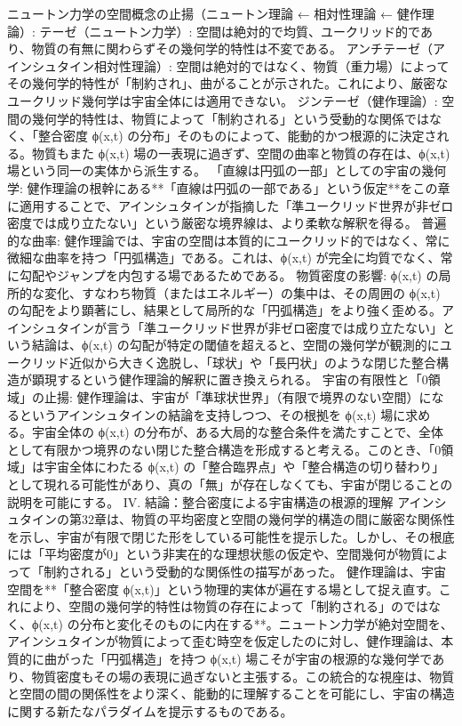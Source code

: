 \documentclass{article}
\begin{document}
ニュートン力学の空間概念の止揚（ニュートン理論 ← 相対性理論 ← 健作理論）:
テーゼ（ニュートン力学）: 空間は絶対的で均質、ユークリッド的であり、物質の有無に関わらずその幾何学的特性は不変である。
アンチテーゼ（アインシュタイン相対性理論）: 空間は絶対的ではなく、物質（重力場）によってその幾何学的特性が「制約され」、曲がることが示された。これにより、厳密なユークリッド幾何学は宇宙全体には適用できない。
ジンテーゼ（健作理論）: 空間の幾何学的特性は、物質によって「制約される」という受動的な関係ではなく、「整合密度 ϕ(x,t) の分布」そのものによって、能動的かつ根源的に決定される。物質もまた ϕ(x,t) 場の一表現に過ぎず、空間の曲率と物質の存在は、ϕ(x,t) 場という同一の実体から派生する。
「直線は円弧の一部」としての宇宙の幾何学:
健作理論の根幹にある**「直線は円弧の一部である」という仮定**をこの章に適用することで、アインシュタインが指摘した「準ユークリッド世界が非ゼロ密度では成り立たない」という厳密な境界線は、より柔軟な解釈を得る。
普遍的な曲率: 健作理論では、宇宙の空間は本質的にユークリッド的ではなく、常に微細な曲率を持つ「円弧構造」である。これは、ϕ(x,t) が完全に均質でなく、常に勾配やジャンプを内包する場であるためである。
物質密度の影響: ϕ(x,t) の局所的な変化、すなわち物質（またはエネルギー）の集中は、その周囲の ϕ(x,t) の勾配をより顕著にし、結果として局所的な「円弧構造」をより強く歪める。アインシュタインが言う「準ユークリッド世界が非ゼロ密度では成り立たない」という結論は、ϕ(x,t) の勾配が特定の閾値を超えると、空間の幾何学が観測的にユークリッド近似から大きく逸脱し、「球状」や「長円状」のような閉じた整合構造が顕現するという健作理論的解釈に置き換えられる。
宇宙の有限性と「0領域」の止揚:
健作理論は、宇宙が「準球状世界」（有限で境界のない空間）になるというアインシュタインの結論を支持しつつ、その根拠を ϕ(x,t) 場に求める。宇宙全体の ϕ(x,t) の分布が、ある大局的な整合条件を満たすことで、全体として有限かつ境界のない閉じた整合構造を形成すると考える。このとき、「0領域」は宇宙全体にわたる ϕ(x,t) の「整合臨界点」や「整合構造の切り替わり」として現れる可能性があり、真の「無」が存在しなくても、宇宙が閉じることの説明を可能にする。
IV. 結論：整合密度による宇宙構造の根源的理解
アインシュタインの第32章は、物質の平均密度と空間の幾何学的構造の間に厳密な関係性を示し、宇宙が有限で閉じた形をしている可能性を提示した。しかし、その根底には「平均密度が0」という非実在的な理想状態の仮定や、空間幾何が物質によって「制約される」という受動的な関係性の描写があった。
健作理論は、宇宙空間を**「整合密度 ϕ(x,t)」という物理的実体が遍在する場として捉え直す。これにより、空間の幾何学的特性は物質の存在によって「制約される」のではなく、ϕ(x,t) の分布と変化そのものに内在する**。ニュートン力学が絶対空間を、アインシュタインが物質によって歪む時空を仮定したのに対し、健作理論は、本質的に曲がった「円弧構造」を持つ ϕ(x,t) 場こそが宇宙の根源的な幾何学であり、物質密度もその場の表現に過ぎないと主張する。この統合的な視座は、物質と空間の間の関係性をより深く、能動的に理解することを可能にし、宇宙の構造に関する新たなパラダイムを提示するものである。
\end{document}
